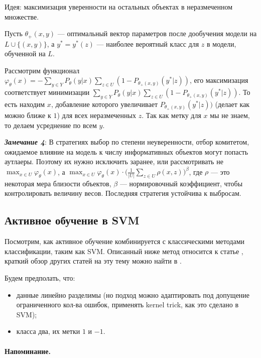 \documentclass[specialist, 12pt, href]{article}
\begin{document}
Идея: максимизация уверенности на остальных объектах в неразмеченном
множестве.

Пусть \(\theta_+(x, y)\) --- оптимальный вектор параметров после
дообучения модели на \(L \cup \{(x, y)\}\), а \(y^* = y^*(z)\) ---
наиболее вероятный класс для \(z\) в модели, обученной на \(L\).

Рассмотрим функционал
\(\varphi_{\theta}(x) = - \sum_{y \in Y} P_{\theta}(y|x) \sum_{z \in U} (1 - P_{\theta_+(x, y)}(y^*|z))\),
его максимизация соответствует минимизации
\(\sum_{y \in Y} P_{\theta}(y|x) \sum_{z \in U} (1 - P_{\theta_+(x, y)}(y^*|z))\).
То есть находим \(x\), добавление которого увеличивает
\(P_{\theta_+(x, y)}(y^*|z))\) (делает как можно ближе к \(1\)) для всех
неразмеченных \(z\). Так как метку для \(x\) мы не знаем, то делаем
усреднение по всем \(y\).

\emph{\textbf{Замечание 4}}: В стратегиях выбор по степени неуверенности,
отбор комитетом, ожидаемое влияние на модель к числу информативных
объектов могут попасть аутлаеры. Поэтому их нужно исключить заранее, или
рассмотривать не \(\max_{x \in U} \varphi_{\theta}(x)\), а
\(\max_{x \in U} \varphi_{\theta}(x)\cdot \big(\frac{1}{|U|}\sum_{z \in U}\rho(x, z)\big)^{\beta}\),
где \(\rho\) --- это некоторая мера близости объектов, \(\beta\) ---
нормировочный коэффициент, чтобы контролировать величину весов.
Последняя стратегия устойчива к выбросам.

\subsection{Активное обучение в
SVM}

Посмотрим, как активное обучение комбинируется с классическими методами
классификации, таким как SVM. Описанный ниже метод относится к статье
\cite{TongKoller}, краткий обзор других статей на эту тему можно
найти в \cite{Settles}.

Будем предполать, что:

\begin{itemize}
\item
  данные линейно разделимы (но подход можно адаптировать под допущение
  ограниченного кол-ва ошибок, применять kernel trick, как это сделано в
  SVM);
\item
  класса два, их метки \(1\) и \(-1\).
\end{itemize}

\paragraph{Напоминание.}
\end{document}

